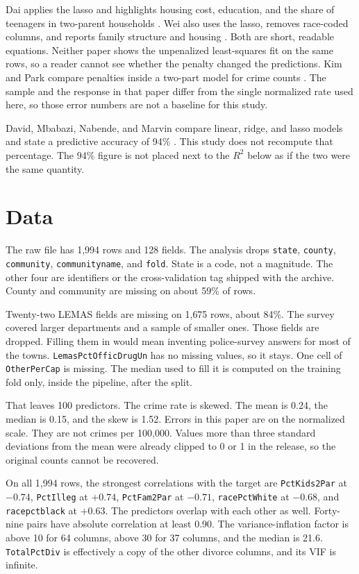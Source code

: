\documentclass[conference]{IEEEtran}
\begin{document}
Dai applies the lasso and highlights housing cost, education, and the share of teenagers in two-parent households \cite{dai2024}.
Wei also uses the lasso, removes race-coded columns, and reports family structure and housing \cite{wei2025}.
Both are short, readable equations.
Neither paper shows the unpenalized least-squares fit on the same rows, so a reader cannot see whether the penalty changed the predictions.
Kim and Park compare penalties inside a two-part model for crime counts \cite{kim2024}.
The sample and the response in that paper differ from the single normalized rate used here, so those error numbers are not a baseline for this study.

David, Mbabazi, Nabende, and Marvin compare linear, ridge, and lasso models and state a predictive accuracy of 94\% \cite{david2023}.
This study does not recompute that percentage.
The 94\% figure is not placed next to the $R^{2}$ below as if the two were the same quantity.

\section{Data}
The raw file has 1{,}994 rows and 128 fields.
The analysis drops \texttt{state}, \texttt{county}, \texttt{community}, \texttt{communityname}, and \texttt{fold}.
State is a code, not a magnitude.
The other four are identifiers or the cross-validation tag shipped with the archive.
County and community are missing on about 59\% of rows.

Twenty-two LEMAS fields are missing on 1{,}675 rows, about 84\%.
The survey covered larger departments and a sample of smaller ones.
Those fields are dropped.
Filling them in would mean inventing police-survey answers for most of the towns.
\texttt{LemasPctOfficDrugUn} has no missing values, so it stays.
One cell of \texttt{OtherPerCap} is missing.
The median used to fill it is computed on the training fold only, inside the pipeline, after the split.

That leaves 100 predictors.
The crime rate is skewed.
The mean is 0.24, the median is 0.15, and the skew is 1.52.
Errors in this paper are on the normalized scale.
They are not crimes per 100{,}000.
Values more than three standard deviations from the mean were already clipped to 0 or 1 in the release, so the original counts cannot be recovered.

On all 1{,}994 rows, the strongest correlations with the target are \texttt{PctKids2Par} at $-0.74$, \texttt{PctIlleg} at $+0.74$, \texttt{PctFam2Par} at $-0.71$, \texttt{racePctWhite} at $-0.68$, and \texttt{racepctblack} at $+0.63$.
The predictors overlap with each other as well.
Forty-nine pairs have absolute correlation at least 0.90.
The variance-inflation factor is above 10 for 64 columns, above 30 for 37 columns, and the median is 21.6.
\texttt{TotalPctDiv} is effectively a copy of the other divorce columns, and its VIF is infinite.
\end{document}
